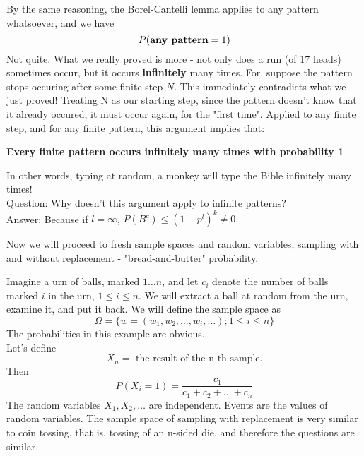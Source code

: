 By the same reasoning, the Borel-Cantelli lemma applies to any 
pattern whatsoever, and we have
\begin{equation}
P(\mbox{\bf any pattern}=1)
\end{equation}
Not quite. What we really proved is more - not only does a run 
(of 17 heads) sometimes occur, but it occurs {\bf infinitely} 
many times. For, suppose the pattern stops occuring after some
finite step $N$. This immediately contradicts what we just proved!
Treating N as our starting step, since the pattern doesn't know
that it already occured, it must occur again, for the "first time".
Applied to any finite step, and for any finite pattern, this argument 
implies that:
\begin{center}
\bf Every finite pattern occurs infinitely many times with probability
1
\end{center}
In other words, typing at random, a monkey will type the Bible 
infinitely many times! \\
Question: Why doesn't this argument apply to infinite patterns? \\
Answer:   Because if $l=\infty$, $P(B^{c}) \leq (1-p^{l})^{k} \neq 0$

Now we will proceed to fresh sample spaces and random variables,
sampling with and without replacement - "bread-and-butter"
probability.


Imagine a urn of balls, marked $1 \ldots n$, and let $c_{i}$ denote the
number of balls marked $i$ in the urn, $1 \leq i \leq n$.
We will extract a ball at random from the urn, examine it, and put it
back. We will define the sample space as 
\begin{equation}
\Omega = \{ w = (w_{1},w_{2}, \ldots,w_{i},\ldots); 1 \leq i \leq n \}
\end{equation}
The probabilities in this example are obvious.\\
Let's define 
\begin{equation}
X_{n} = \mbox{ the result of the n-th sample.}
\end{equation}
Then
\begin{equation}
P(X_{i}=1) = \frac {c_{1}}{c_{1}+c_{2}+\ldots+c_{n}}
\end{equation}
The random variables $X_{1}, X_{2}, \ldots$ are independent. Events are the
values of random variables. The sample space of sampling with
replacement is very similar to coin tossing, that is, tossing of an n-sided
die, and therefore the questions are similar. 

